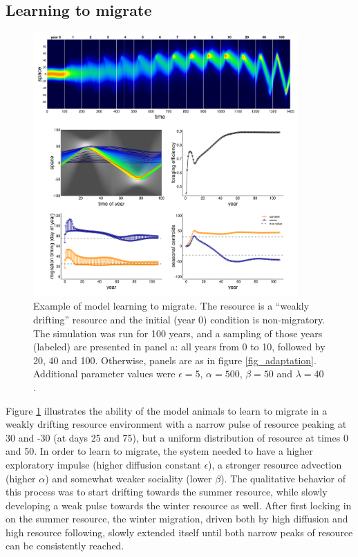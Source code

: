 \documentclass[utf8]{frontiersSCNS} %
\begin{document}
\subsection{Learning to migrate}

\begin{figure}
	\includegraphics[width = 0.9\textwidth]{figures/example2_learningtomigrate.png} 
	
	\caption{\label{fig_learningtomigrate} Example of model learning to migrate. The resource is a ``weakly drifting'' resource and the initial (year 0) condition is non-migratory. The simulation was run for 100 years, and a sampling of those years (labeled) are presented in panel a: all years from 0 to 10, followed by 20, 40 and 100. Otherwise, panels are as in figure \ref{fig_adaptation}. Additional parameter values were $\epsilon = 5$, $\alpha = 500$, $\beta = 50$ and $\lambda = 40$.}
\end{figure}

Figure \ref{fig_learningtomigrate} illustrates the ability of the model animals to learn to migrate in a weakly drifting resource environment with a narrow pulse of resource peaking at 30 and -30 (at days 25 and 75), but a uniform distribution of resource at times 0 and 50. In order to learn to migrate, the system needed to have a higher exploratory impulse (higher diffusion constant $\epsilon$), a stronger resource advection (higher $\alpha$) and somewhat weaker sociality (lower $\beta$). The qualitative behavior of this process was to start drifting towards the summer resource, while slowly developing a weak pulse towards the winter resource as well. After first locking in on the summer resource, the winter migration, driven both by high diffusion and high resource following, slowly extended itself until both narrow peaks of resource can be consistently reached.
\end{document}
